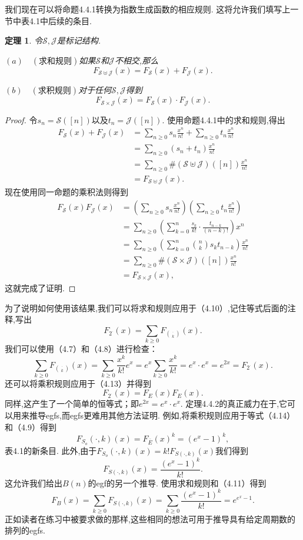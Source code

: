 \documentclass[a4paper,12pt]{ctexbook}
\newtheorem{theorem}[lemma]{\hspace{2em}定理}%
\begin{document}
我们现在可以将命题4.4.1转换为指数生成函数的相应规则.  这将允许我们填写上一节中表4.1中后续的条目.  
\begin{theorem}
	令$\mathcal{S},\mathcal{J}$是标记结构. 
	
	$(a)\quad(\text{求和规则})$如果$\mathcal{S}$和$\mathcal{J}$不相交,那么
	$$F_{\mathcal{S}\uplus\mathcal{J}}(x)=F_{\mathcal{S}}(x)+F_{\mathcal{J}}(x). $$
	
	$(b)\quad(\text{求积规则})$对于任何$\mathcal{S},\mathcal{J}$得到
	$$F_{\mathcal{S}\times\mathcal{J}}(x)=F_{\mathcal{S}}(x)\cdot F_{\mathcal{J}}(x). $$
\end{theorem}
\begin{proof}
	令$s_n=\mathcal{S}([n])$以及$t_n=\mathcal{J}([n])$. 使用命题4.4.1中的求和规则,得出\begin{align*}
	F_{\mathcal{S}}(x)+F_{\mathcal{J}}(x)
	&=\sum_{n\geq0}s_n\frac{x^n}{n!}+\sum_{n\geq0}t_n\frac{x^n}{n!}\\
	&=\sum_{n\geq0}(s_n+t_n)\frac{x^n}{n!}\\
	&=\sum_{n\geq0}\#(\mathcal{S}\uplus\mathcal{J})([n])\frac{x^n}{n!}\\
	&=F_{\mathcal{S}\uplus\mathcal{J}}(x). 
	\end{align*}
	现在使用同一命题的乘积法则得到
	\begin{align*}
	F_{\mathcal{S}}(x)F_{\mathcal{J}}(x)
	&=\left(\sum_{n\geq0}s_n\frac{x^n}{n!}\right)\left(\sum_{n\geq0}t_n\frac{x^n}{n!}\right)\\
	&=\sum_{n\geq0}\left(\sum_{k=0}^n\frac{s_k}{k!}\cdot \frac{t_{n-k}}{(n-k)!}\right)x^n\\
	&=\sum_{n\geq0}\left(\sum_{k=0}^n\binom{n}{k}s_kt_{n-k}\right)\frac{x^n}{n!}\\
	&=\sum_{n\geq0}\#(\mathcal{S}\times\mathcal{J})([n])\frac{x^n}{n!}\\
	&=F_{\mathcal{S}\times\mathcal{J}}(x),
	\end{align*}
	这就完成了证明.  
\end{proof}

为了说明如何使用该结果,我们可以将求和规则应用于（4.10）,记住等式后面的注释,写出
$$F_{2^\cdot}(x)=\sum_{k\geq0}F_{\binom{\cdot}{k}}(x). $$
我们可以使用（4.7）和（4.8）进行检查：
$$\sum_{k\geq0}F_{\binom{\cdot}{k}}(x)=\sum_{k\geq0}\frac{x^k}{k!}e^x=e^x\sum_{k\geq0}\frac{x^k}{k!}=e^x\cdot e^x=e^{2x}=F_{2^\cdot}(x). $$
还可以将乘积规则应用于（4.13）并得到
$$F_{2^\cdot}(x)=F_E(x)F_E(x). $$
同样,这产生了一个简单的恒等式；即$e^{2x}=e^x\cdot e^x$. 
定理4.4.2的真正威力在于,它可以用来推导egfs,而egfs更难用其他方法证明.  例如,将乘积规则应用于等式（4.14）和（4.9）得到
$$F_{S_o}(\cdot,k)(x)=F_{\bar{E}}{(x)^k}={(e^x-1)}^k,$$
表4.1的新条目.  此外,由于$F_{S_o}(\cdot,k)(x)=k!F_{S(\cdot,k)}(x)$我们得到
$$F_{S(\cdot,k)}(x)=\frac{{(e^x-1)}^k}{k!}. $$
这允许我们给出$B(n)$的egf的另一个推导.  使用求和规则和（4.11）得到
$$F_{B}(x)=\sum_{k\geq0}F_{S(\cdot,k)}(x)=\sum_{k\geq0}\frac{{(e^x-1)}^k}{k!}=e^{e^x-1}. $$
正如读者在练习中被要求做的那样,这些相同的想法可用于推导具有给定周期数的排列的egfs.  
\end{document}
